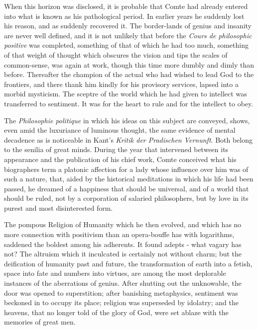 \documentclass[]{book}
\begin{document}
When this horizon was disclosed, it is probable that Comte had already
entered into what is known as his pathological period. In earlier years
he suddenly lost his reason, and as suddenly recovered it. The
border-lands of genius and insanity are never well defined, and it is
not unlikely that before the \emph{Cours de philosophic positive} was
completed, something of that of which he had too much, something of that
weight of thought which obscures the vision and tips the scales of
common-sense, was again at work, though this time more dumbly and dimly
than before. Thereafter the champion of the actual who had wished to
lead God to the frontiers, and there thank him kindly for his provisory
services, lapsed into a morbid mysticism. The sceptre of the world which
he had given to intellect was transferred to sentiment. It was for the
heart to rule and for the intellect to obey.

The \emph{Philosophie politique} in which his ideas on this subject are
conveyed, shows, even amid the luxuriance of luminous thought, the same
evidence of mental decadence as is noticeable in Kant's \emph{Kritik der
Pradischen Vernunft}. Both belong to the senilia of great minds. During
the year that intervened between its appearance and the publication of
his chief work, Comte conceived what his biographers term a platonic
affection for a lady whose influence over him was of such a nature,
that, aided by the historical meditations in which his life had been
passed, he dreamed of a happiness that should be universal, and of a
world that should be ruled, not by a corporation of salaried
philosophers, but by love in its purest and most disinterested form.

The pompous Religion of Humanity which he then evolved, and which has no
more connection with positivism than an opera-bouffe has with
logarithms, saddened the boldest among his adherents. It found adepts -
what vagary has not? The altruism which it inculcated is certainly not
without charm; but the deification of humanity past and future, the
transformation of earth into a fetish, space into fate and numbers into
virtues, are among the most deplorable instances of the aberrations of
genius. After shutting out the unknowable, the door was opened to
superstition; after banishing metaphysics, sentiment was beckoned in to
occupy its place; religion was superseded by idolatry; and the heavens,
that no longer told of the glory of God, were set ablaze with the
memories of great men.
\end{document}

